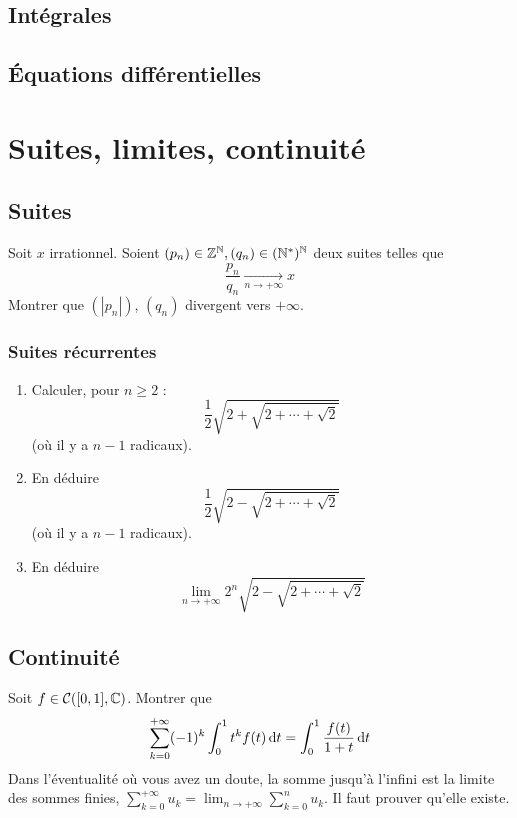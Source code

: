 \documentclass[12pt,a4paper]{exo_book}
\begin{document}
\section{Intégrales}

\section{Équations différentielles}

\chapter{Suites, limites, continuité}

\section{Suites}

\begin{exo}
    Soit $x$ irrationnel. Soient $(p_n) \in \mathbb{Z}^{\mathbb{N}}, (q_n) \in (\mathbb{N}^*) ^ {\mathbb{N}}$ deux suites telles que
    \[\frac{p_n}{q_n}\xrightarrow[n\to +\infty]{} x\]
    Montrer que $(|p_n|)$, $(q_n)$ divergent vers $+\infty$.
\end{exo}

\subsection*{Suites récurrentes}

\begin{exo}
    \begin{enumerate}
        \item Calculer, pour $n \ge 2$ :
        \[\frac{1}{2} \sqrt{2 + \sqrt{2 + \cdots + \sqrt{2}}}\]
        (où il y a $n-1$ radicaux).
        \item En déduire
        \[\frac{1}{2} \sqrt{2 - \sqrt{2 + \cdots + \sqrt{2}}}\]
        (où il y a $n-1$ radicaux).
        \item En déduire
        \[\lim_{n\to +\infty} 2^n \sqrt{2 - \sqrt{2 + \cdots + \sqrt{2}}}\]
    \end{enumerate}
\end{exo}

\section{Continuité}


\begin{exo}
    Soit $f \in \mathcal{C}([0,1], \mathbb{C})$. Montrer que
    \[\sum_{k=0}^{+\infty} (-1)^k \int_0^1 t^k f(t) {\rm \, d} t = \int_0^1 \frac{f(t)}{1+t} {\rm \, d} t\]
    Dans l'éventualité où vous avez un doute, la somme jusqu'à l'infini est la limite des sommes finies, $\sum_{k=0}^{+\infty} u_k = \lim_{n\to +\infty} \sum_{k=0}^n u_k$. Il faut prouver qu'elle existe.
\end{exo}
\end{document}
